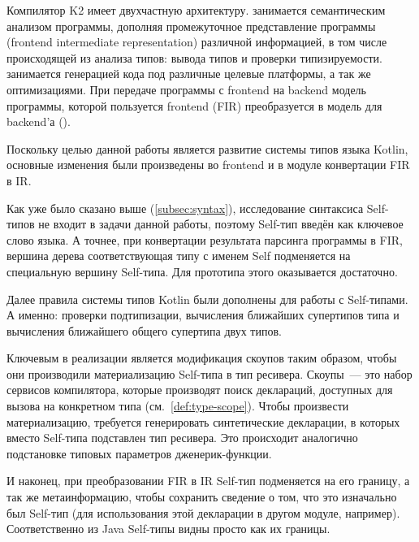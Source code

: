 Компилятор K2 имеет двухчастную архитектуру.
 занимается семантическим анализом программы, дополняя промежуточное представление программы  (frontend intermediate representation) различной информацией, в том числе происходящей из анализа типов: вывода типов и проверки типизируемости.
 занимается генерацией кода под различные целевые платформы, а так же оптимизациями.
При передаче программы с frontend на backend модель программы, которой пользуется frontend (FIR) преобразуется в модель для backend'а ().

Поскольку целью данной работы является развитие системы типов языка Kotlin, основные изменения были произведены во frontend и в модуле конвертации FIR в IR.

Как уже было сказано выше (\ref{subsec:syntax}), исследование синтаксиса Self-типов не входит в задачи данной работы, поэтому Self-тип введён как ключевое слово языка.
А точнее, при конвертации результата парсинга программы в FIR, вершина дерева соответствующая типу с именем Self подменяется на специальную вершину Self-типа.
Для прототипа этого оказывается достаточно.

Далее правила системы типов Kotlin были дополнены для работы с Self-типами.
А именно: проверки подтипизации, вычисления ближайших супертипов типа и вычисления ближайшего общего супертипа двух типов.

Ключевым в реализации является модификация скоупов таким образом, чтобы они производили материализацию Self-типа в тип ресивера.
Скоупы~--- это набор сервисов компилятора, которые производят поиск деклараций, доступных для вызова на конкретном типа (см.~\ref{def:type-scope}).
Чтобы произвести материализацию, требуется генерировать синтетические декларации, в которых вместо Self-типа подставлен тип ресивера.
Это происходит аналогично подстановке типовых параметров дженерик-функции.

И наконец, при преобразовании FIR в IR Self-тип подменяется на его границу, а так же метаинформацию, чтобы сохранить сведение о том, что это изначально был Self-тип (для использования этой декларации в другом модуле, например).
Соответственно из Java Self-типы видны просто как их границы.

